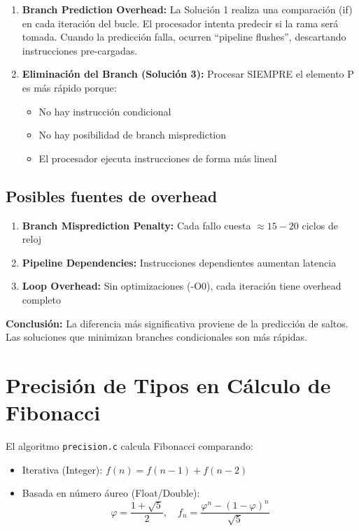 \documentclass[11pt,a4paper]{article}
\begin{document}
\begin{enumerate}
\item \textbf{Branch Prediction Overhead:} La Solución 1 realiza una comparación (if) en cada iteración del bucle. El procesador intenta predecir si la rama será tomada. Cuando la predicción falla, ocurren ``pipeline flushes'', descartando instrucciones pre-cargadas.

\item \textbf{Eliminación del Branch (Solución 3):} Procesar SIEMPRE el elemento P es más rápido porque:
\begin{itemize}
    \item No hay instrucción condicional
    \item No hay posibilidad de branch misprediction
    \item El procesador ejecuta instrucciones de forma más lineal
\end{itemize}
\end{enumerate}

\subsection*{Posibles fuentes de overhead}

\begin{enumerate}
\item \textbf{Branch Misprediction Penalty:} Cada fallo cuesta $\approx 15-20$ ciclos de reloj
\item \textbf{Pipeline Dependencies:} Instrucciones dependientes aumentan latencia
\item \textbf{Loop Overhead:} Sin optimizaciones (-O0), cada iteración tiene overhead completo
\end{enumerate}

\textbf{Conclusión:} La diferencia más significativa proviene de la predicción de saltos. Las soluciones que minimizan branches condicionales son más rápidas.

\section{Precisión de Tipos en Cálculo de Fibonacci}

El algoritmo \texttt{precision.c} calcula Fibonacci comparando:
\begin{itemize}
    \item Iterativa (Integer): $f(n) = f(n-1) + f(n-2)$
    \item Basada en número áureo (Float/Double):
    $$\varphi = \frac{1 + \sqrt{5}}{2}, \quad f_n = \frac{\varphi^n - (1-\varphi)^n}{\sqrt{5}}$$
\end{itemize}
\end{document}
